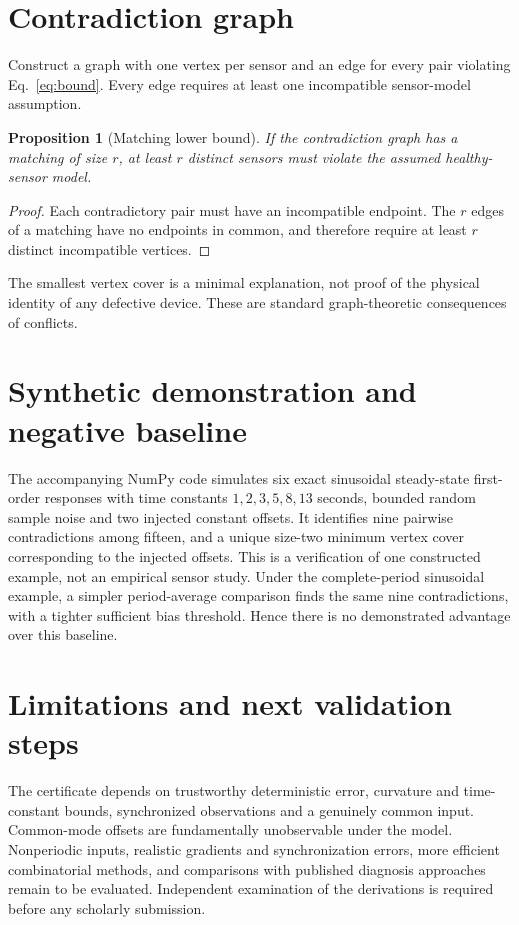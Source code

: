 \documentclass[11pt]{article}
\newtheorem{proposition}{Proposition}
\begin{document}
\section{Contradiction graph}
Construct a graph with one vertex per sensor and an edge for every pair violating Eq.~\eqref{eq:bound}. Every edge requires at least one incompatible sensor-model assumption.
\begin{proposition}[Matching lower bound]
If the contradiction graph has a matching of size $r$, at least $r$ distinct sensors must violate the assumed healthy-sensor model.
\end{proposition}
\begin{proof}
Each contradictory pair must have an incompatible endpoint. The $r$ edges of a matching have no endpoints in common, and therefore require at least $r$ distinct incompatible vertices.
\end{proof}
The smallest vertex cover is a minimal explanation, not proof of the physical identity of any defective device. These are standard graph-theoretic consequences of conflicts.
\section{Synthetic demonstration and negative baseline}
The accompanying NumPy code simulates six exact sinusoidal steady-state first-order responses with time constants $1,2,3,5,8,13$ seconds, bounded random sample noise and two injected constant offsets. It identifies nine pairwise contradictions among fifteen, and a unique size-two minimum vertex cover corresponding to the injected offsets. This is a verification of one constructed example, not an empirical sensor study. Under the complete-period sinusoidal example, a simpler period-average comparison finds the same nine contradictions, with a tighter sufficient bias threshold. Hence there is no demonstrated advantage over this baseline.
\section{Limitations and next validation steps}
The certificate depends on trustworthy deterministic error, curvature and time-constant bounds, synchronized observations and a genuinely common input. Common-mode offsets are fundamentally unobservable under the model. Nonperiodic inputs, realistic gradients and synchronization errors, more efficient combinatorial methods, and comparisons with published diagnosis approaches remain to be evaluated. Independent examination of the derivations is required before any scholarly submission.
\end{document}
